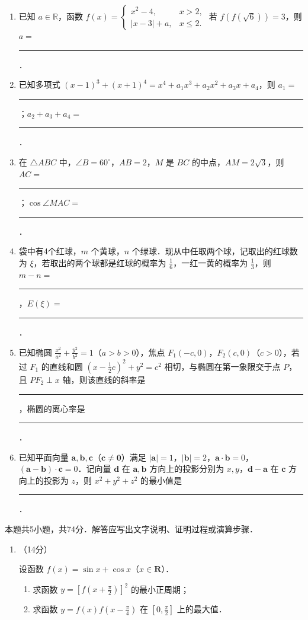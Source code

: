 \begin{description}
\begin{enumerate}[leftmargin=5pt]
        \item 已知 $a\in\mathbb{R}$，函数 $f(x)=\begin{cases}x^{2}-4,&x>2,\\|x-3|+a,&x\leqslant2.\end{cases}$ 若 $f(f(\sqrt{6}))=3$，则 $a=$ \rule[-0.3ex]{3em}{0.4pt}．
        \item 已知多项式 $(x-1)^{3}+(x+1)^{4}=x^{4}+a_{1}x^{3}+a_{2}x^{2}+a_{3}x+a_{4}$，则 $a_{1}=$ \rule[-0.3ex]{3em}{0.4pt}；$a_{2}+a_{3}+a_{4}=$ \rule[-0.3ex]{3em}{0.4pt}．
        \item 在 $\triangle ABC$ 中，$\angle B=60^{\circ}$，$AB=2$，$M$ 是 $BC$ 的中点，$AM=2\sqrt{3}$，则 $AC=$ \rule[-0.3ex]{3em}{0.4pt}；$\cos\angle MAC=$ \rule[-0.3ex]{3em}{0.4pt}．
        \item 袋中有4个红球，$m$ 个黄球，$n$ 个绿球．现从中任取两个球，记取出的红球数为 $\xi$，若取出的两个球都是红球的概率为 $\frac{1}{6}$，一红一黄的概率为 $\frac{1}{3}$，则 $m-n=$ \rule[-0.3ex]{3em}{0.4pt}，$E(\xi)=$ \rule[-0.3ex]{3em}{0.4pt}．
        \item 已知椭圆 $\frac{x^{2}}{a^{2}}+\frac{y^{2}}{b^{2}}=1$（$a>b>0$），焦点 $F_{1}(-c,0)$，$F_{2}(c,0)$（$c>0$），若过 $F_{1}$ 的直线和圆 $\left(x-\frac{1}{2}c\right)^{2}+y^{2}=c^{2}$ 相切，与椭圆在第一象限交于点 $P$，且 $PF_{2}\perp x$ 轴，则该直线的斜率是 \rule[-0.3ex]{3em}{0.4pt}，椭圆的离心率是 \rule[-0.3ex]{3em}{0.4pt}．
        \item 已知平面向量 $\bm{a},\bm{b},\bm{c}$（$\bm{c}\neq\bm{0}$）满足 $|\bm{a}|=1$，$|\bm{b}|=2$，$\bm{a}\cdot\bm{b}=0$，$(\bm{a}-\bm{b})\cdot\bm{c}=0$．记向量 $\bm{d}$ 在 $\bm{a},\bm{b}$ 方向上的投影分别为 $x,y$，$\bm{d}-\bm{a}$ 在 $\bm{c}$ 方向上的投影为 $z$，则 $x^{2}+y^{2}+z^{2}$ 的最小值是 \rule[-0.3ex]{3em}{0.4pt}．
    \end{enumerate}

    \item[三、解答题] 本题共5小题，共74分．解答应写出文字说明、证明过程或演算步骤．
    \begin{enumerate}[leftmargin=5pt]
      \addtocounter{enumi}{+17}
        \item （14分）

        设函数 $f(x)=\sin x+\cos x$（$x\in\mathbf{R}$）．

        \begin{enumerate}[label=(\arabic*)]
            \item 求函数 $y=\left[f\left(x+\frac{\pi}{2}\right)\right]^{2}$ 的最小正周期；
            \item 求函数 $y=f(x)f\left(x-\frac{\pi}{4}\right)$ 在 $\left[0,\frac{\pi}{2}\right]$ 上的最大值．
        \end{enumerate}


\end{enumerate}
\end{description}
